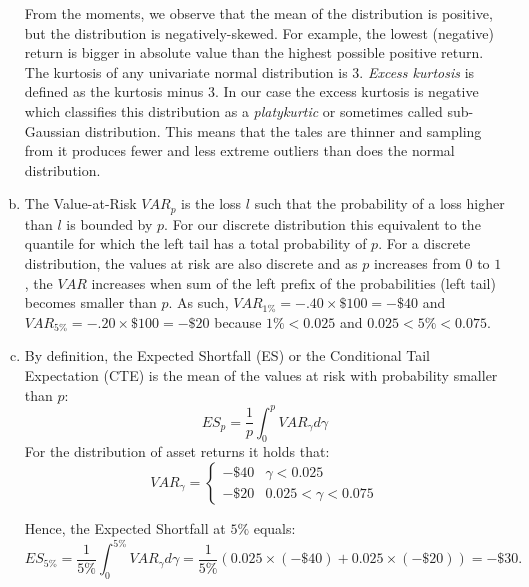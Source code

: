 \documentclass[10pt]{article}
\newenvironment{exercise}[2][Exercise]{\begin{trivlist}
  \item[\hskip \labelsep {\bfseries #1}\hskip \labelsep {\bfseries #2.}]}{\end{trivlist}}
\begin{document}
\begin{exercise}{2}
\begin{enumerate}[(a)]
  From the moments, we observe that the mean of the distribution is positive,
  but the distribution is negatively-skewed. For example, the lowest (negative)
  return is bigger in absolute value than the highest possible positive return.
  The kurtosis of any univariate normal distribution is 3. \textit{Excess
    kurtosis} is defined as the kurtosis minus 3. In our case the excess
  kurtosis is negative which classifies this distribution as a
  \textit{platykurtic} or sometimes called sub-Gaussian distribution. This means
  that the tales are thinner and sampling from it produces fewer and less
  extreme outliers than does the normal distribution.
\item
  The Value-at-Risk $VAR_p$ is the loss $l$ such that the probability of a loss
  higher than $l$ is bounded by $p$. For our discrete distribution this
  equivalent to the quantile for which the left tail has a total probability of
  $p$. For a discrete distribution, the values at risk are also discrete and as
  $p$ increases from $0$ to $1$, the $VAR$ increases when sum of the left prefix
  of the probabilities (left tail) becomes smaller than $p$. As such, $VAR_{1\%}
  = -.40 \times \$ 100 = -\$ 40$
  and $VAR_{5\%} = -.20 \times \$ 100 = -\$20$ because $1\% < 0.025$ and $0.025 < 5\% < 0.075$.

 \item
   By definition, the Expected Shortfall (ES) or the Conditional Tail
   Expectation (CTE) is the mean of the values at risk with probability smaller
   than $p$:
   \begin{equation*}
     ES_p = \frac 1 p \int_0^p VAR_\gamma d\gamma
   \end{equation*}
   For the distribution of asset returns it holds that:
   \begin{equation*}
     VAR_\gamma = \begin{cases} -\$ 40 & \gamma < 0.025 \\ -\$ 20 & 0.025 < \gamma < 0.075 \end{cases}
   \end{equation*}

   Hence, the Expected Shortfall at $5\%$ equals:
   \begin{equation*}
     ES_{5\%} = \frac{1}{5\%} \int_0^{5\%} VAR_\gamma d\gamma = \frac{1}{5\%} \left( 0.025 \times (-\$ 40) + 0.025 \times (-\$20) \right) = - \$ 30.
   \end{equation*}


\end{enumerate}
\end{exercise}
\end{document}
